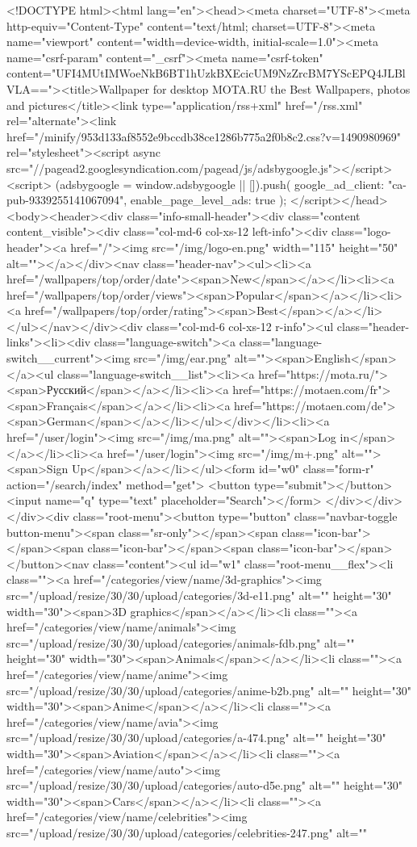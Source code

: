 <!DOCTYPE html><html lang="en"><head><meta charset="UTF-8"><meta http-equiv="Content-Type" content="text/html; charset=UTF-8"><meta name="viewport" content="width=device-width, initial-scale=1.0"><meta name="csrf-param" content="_csrf"><meta name="csrf-token" content="UFI4MUtIMWoeNkB6BT1hUzkBXEcicUM9NzZrcBM7YScEPQ4JLBlVLA=="><title>Wallpaper for desktop MOTA.RU the Best Wallpapers, photos and pictures</title><link type="application/rss+xml" href="/rss.xml" rel="alternate"><link href="/minify/953d133af8552e9bccdb38ce1286b775a2f0b8c2.css?v=1490980969" rel="stylesheet"><script async src="//pagead2.googlesyndication.com/pagead/js/adsbygoogle.js"></script><script>
(adsbygoogle = window.adsbygoogle || []).push({
google_ad_client: "ca-pub-9339255141067094",
enable_page_level_ads: true
});
</script></head><body><header><div class="info-small-header"><div class="content content_visible"><div class="col-md-6 col-xs-12 left-info"><div class="logo-header"><a href="/"><img src="/img/logo-en.png" width="115" height="50" alt=""></a></div><nav class="header-nav"><ul><li><a href="/wallpapers/top/order/date"><span>New</span></a></li><li><a href="/wallpapers/top/order/views"><span>Popular</span></a></li><li><a href="/wallpapers/top/order/rating"><span>Best</span></a></li></ul></nav></div><div class="col-md-6 col-xs-12 r-info"><ul class="header-links"><li><div class="language-switch"><a class="language-switch__current"><img src="/img/ear.png" alt=""><span>English</span></a><ul class="language-switch__list"><li><a href="https://mota.ru/"><span>Русский</span></a></li><li><a href="https://motaen.com/fr"><span>Français</span></a></li><li><a href="https://motaen.com/de"><span>German</span></a></li></ul></div></li><li><a href="/user/login"><img src="/img/ma.png" alt=""><span>Log in</span></a></li><li><a href="/user/login"><img src="/img/m+.png" alt=""><span>Sign Up</span></a></li></ul><form id="w0" class="form-r" action="/search/index" method="get"> <button type="submit"></button><input name="q" type="text" placeholder="Search"></form> </div></div></div><div class="root-menu"><button type="button" class="navbar-toggle button-menu"><span class="sr-only"></span><span class="icon-bar"></span><span class="icon-bar"></span><span class="icon-bar"></span></button><nav class="content"><ul id="w1" class="root-menu__flex"><li class=""><a href="/categories/view/name/3d-graphics"><img src="/upload/resize/30/30/upload/categories/3d-e11.png" alt="" height="30" width="30"><span>3D graphics</span></a></li><li class=""><a href="/categories/view/name/animals"><img src="/upload/resize/30/30/upload/categories/animals-fdb.png" alt="" height="30" width="30"><span>Animals</span></a></li><li class=""><a href="/categories/view/name/anime"><img src="/upload/resize/30/30/upload/categories/anime-b2b.png" alt="" height="30" width="30"><span>Anime</span></a></li><li class=""><a href="/categories/view/name/avia"><img src="/upload/resize/30/30/upload/categories/a-474.png" alt="" height="30" width="30"><span>Aviation</span></a></li><li class=""><a href="/categories/view/name/auto"><img src="/upload/resize/30/30/upload/categories/auto-d5e.png" alt="" height="30" width="30"><span>Cars</span></a></li><li class=""><a href="/categories/view/name/celebrities"><img src="/upload/resize/30/30/upload/categories/celebrities-247.png" alt="" 